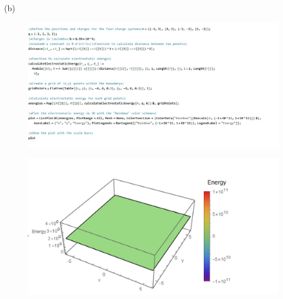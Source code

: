 \documentclass[journal,12pt,onecolumn]{IEEEtran}
\theoremstyle{remark}
\begin{document}
(b)   \begin{figure}[H]
    \centering
     \includegraphics[scale=0.5]{figs/u2.2.b.1.jpeg}
    \caption{}    
    \label{fig:ishitha.em.fig1}
   \end{figure} 
   \begin{figure}[H]
    \centering
     \includegraphics[scale=0.5]{figs/u2.2.b.jpeg}
    \caption{}    
    \label{fig:ishitha.em.fig1}
   \end{figure} 
   
\end{document}
